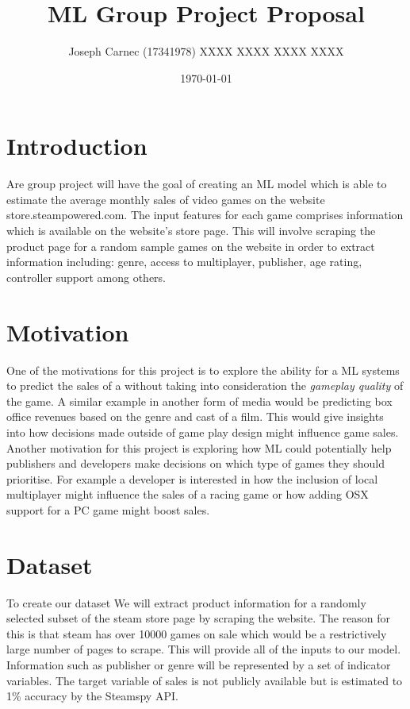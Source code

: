 \documentclass[11pt]{article}
\author{Joseph Carnec (17341978) XXXX XXXX XXXX XXXX}
\date{\today}
\title{ML Group Project Proposal}
\begin{document}
\maketitle

\section{Introduction}
\label{sec:orgcf655bf}

Are group project will have the goal of creating an ML model which is able to estimate the average monthly sales of video games on the website store.steampowered.com. The input features for each game comprises information which is available on the website's store page. This will involve scraping the product page for a random sample games on the website in order to extract information including: genre, access to multiplayer, publisher, age rating, controller support among others.

\section{Motivation}
\label{sec:orgedf640d}

One of the motivations for this project is to explore the ability for a ML systems to predict the sales of a without taking into consideration the \emph{gameplay quality} of the game. A similar example in another form of media would be predicting box office revenues based on the genre and cast of a film. This would give insights into how decisions made outside of game play design might influence game sales. Another motivation for this project is exploring how ML could potentially help publishers and developers make decisions on which type of games they should prioritise. For example a developer is interested in how the inclusion of local multiplayer might influence the sales of a racing game or how adding OSX support for a PC game might boost sales.

\section{Dataset}
\label{sec:org6327ed1}

To create our dataset We will extract product information for a randomly selected subset of the steam store page by scraping the website. The reason for this is that steam has over 10000 games on sale which would be a restrictively large number of pages to scrape. This will provide all of the inputs to our model. Information such as publisher or genre will be represented by a set of indicator variables. The target variable of sales is not publicly available but is estimated to 1\% accuracy by the Steamspy API.
\end{document}
